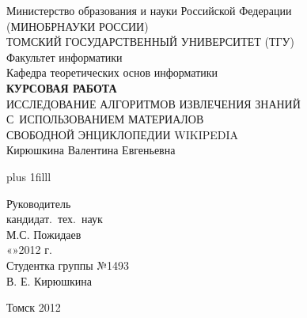 
\thispagestyle{empty}
\vspace{4cm}
\begin{center}

Министерство образования и науки Российской Федерации\\
(МИНОБРНАУКИ РОССИИ)\\
ТОМСКИЙ ГОСУДАРСТВЕННЫЙ УНИВЕРСИТЕТ (ТГУ)\\
Факультет информатики\\
Кафедра теоретических основ информатики\\


\vspace{4cm}
\textbf{КУРСОВАЯ РАБОТА}\\
\vspace{0.5cm}
ИССЛЕДОВАНИЕ АЛГОРИТМОВ ИЗВЛЕЧЕНИЯ ЗНАНИЙ С~ИСПОЛЬЗОВАНИЕМ МАТЕРИАЛОВ \\
СВОБОДНОЙ ЭНЦИКЛОПЕДИИ WIKIPEDIA\\
\vspace{1.0cm}
Кирюшкина Валентина Евгеньевна

\end{center}

\vskip 0pt plus 1filll


\begin{tabbing}

\hspace{10cm}\=Руководитель\\
\> кандидат.~тех.~наук\\
\>\makebox[3cm]{\hrulefill} М.С. Пожидаев\\
\>«\makebox[0.8cm]{\hrulefill}»\makebox[1.5cm]{\hrulefill}2012 г.\\
\>Студентка группы №1493\\
\>\makebox[3cm]{\hrulefill} В. Е. Кирюшкина\\
\end{tabbing}


\vspace*{1cm}

\begin{center}
Томск 2012
\end{center}
